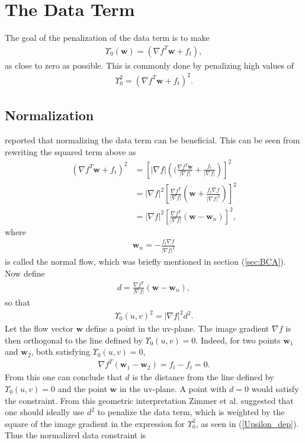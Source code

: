 \chapter{The Data Term}
The goal of the penalization of the data term is to make
\begin{align*}
\Upsilon_0(\textbf{w}) = (\nabla f^T \textbf{w} + f_t), 
\end{align*}
as close to zero as possible. This is commonly done by penalizing high values of 
\begin{align*}
\Upsilon_0^2 = (\nabla f^T \textbf{w} + f_t)^2.
\end{align*}
\section{Normalization}
\cite{zimmer2011optic} reported that normalizing the data term can be beneficial. This can be seen from rewriting the squared term above as
\begin{align*}
(\nabla f^T \textbf{w} + f_t)^2 &= \left[ |\nabla f| \left( (\frac{\nabla f^T \textbf{w}}{|\nabla f|} + \frac{f_t}{|\nabla f|} \right) \right]^2  \\
&= |\nabla f|^2 \left[\frac{\nabla f^T}{|\nabla f|} \left(  \textbf{w} + \frac{f_t \nabla f}{|\nabla f|^2} \right) \right]^2 \\
&= |\nabla f|^2 \left[\frac{\nabla f^T}{|\nabla f|} \left( \textbf{w} - \textbf{w}_n \right) \right]^2 ,
\end{align*}
where
\begin{align}
\textbf{w}_n = - \frac{f_t \nabla f}{|\nabla f|^2}
\end{align}
is called the normal flow, which was briefly mentioned in section (\ref{sec:BCA}). Now define 
\begin{align}
d = \frac{\nabla f^T}{|\nabla f|} \left( \textbf{w} - \textbf{w}_n \right),
\end{align}
so that
\begin{align}
\label{Upsilon_dep}
\Upsilon_0(u,v)^2 = |\nabla f|^2 d^2.
\end{align}
Let the flow vector $\textbf{w}$ define a point in the uv-plane. The image gradient $\nabla f$ is then orthogonal to the line defined by $\Upsilon_0(u,v) = 0$. Indeed, for two points $\textbf{w}_1$ and $\textbf{w}_2$, both satisfying $\Upsilon_0(u,v) = 0$,
\begin{align*}
\nabla f^T (\textbf{w}_1-\textbf{w}_2) = f_t - f_t = 0.
\end{align*}
From this one can conclude that $d$ is the distance from the line defined by $\Upsilon_0(u,v) = 0$ and the point $\textbf{w}$ in the uv-plane. A point with $d = 0$ would satisfy the constraint. From this geometric interpretation Zimmer et al. \cite{zimmer2011optic} suggested that one should ideally use $d^2$ to penalize the data term, which is weighted by the square of the image gradient in the expression for $\Upsilon_0^2$,  as seen in (\ref{Upsilon_dep}). Thus the normalized data constraint is
